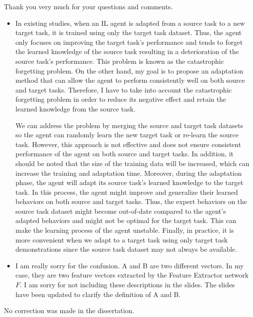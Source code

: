 \begin{revresponse}
  Thank you very much for your questions and comments.

  \begin{itemize}
    \item
          In existing studies, when an IL agent is adapted from a source task to a new target task,
          it is trained using only the target task dataset.
          Thus,
          the agent only focuses on improving the target task's performance and tends to forget the learned knowledge of the source task resulting in a deterioration of the source task's performance.
          This problem is known as the catastrophic forgetting problem.
          On the other hand, my goal is to propose an adaptation method that can allow the agent to perform consistently well on both source and target tasks.
          Therefore, I have to take into account the catastrophic forgetting problem in order to reduce its negative effect and retain the learned knowledge from the source task.

          We can address the problem by merging the source and target task datasets so the agent can randomly learn the new target task or re-learn the source task.
          However, this approach is not effective and does not ensure consistent performance of the agent on both source and target tasks.
          In addition, it should be noted that the size of the training data will be increased, which can increase the training and adaptation time.
          Moreover, during the adaptation phase, the agent will adapt its source task's learned knowledge to the target task.
          In this process, the agent might improve and generalize their learned behaviors on both source and target tasks.
          Thus, the expert behaviors on the source task dataset might become out-of-date compared to the agent's adapted behaviors and might not be optimal for the target task.
          This can make the learning process of the agent unstable.
          Finally, in practice, it is more convenient when we adapt to a target task using only target task demonstrations since the source task dataset may not always be available.
    \item I am really sorry for the confusion.
          A and B are two different vectors.
          In my case, they are two feature vectors extracted by the Feature Extractor network $F$.
          I am sorry for not including these descriptions in the slides.
          The slides have been updated to clarify the definition of A and B.
  \end{itemize}

  \begin{correction}
    No correction was made in the dissertation.
  \end{correction}
\end{revresponse}


